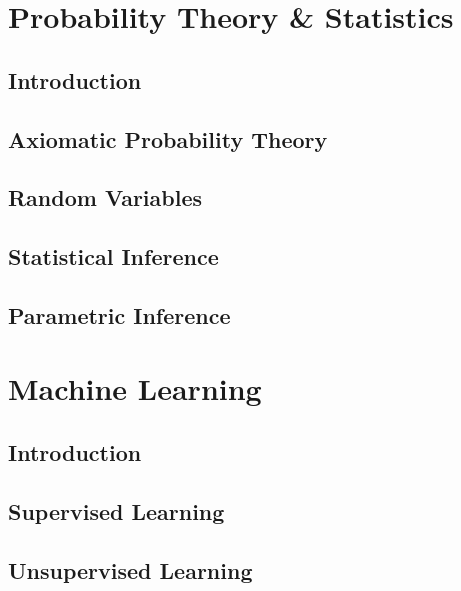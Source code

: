 \documentclass[a4paper, notitlepage]{report}
\begin{document}
\part{Probability Theory \& Statistics}

\chapter{Introduction}


\chapter{Axiomatic Probability Theory}


\chapter{Random Variables}


\chapter{Statistical Inference}


\chapter{Parametric Inference}


\part{Machine Learning}

\chapter{Introduction}


\chapter{Supervised Learning}


\chapter{Unsupervised Learning}

\end{document}
